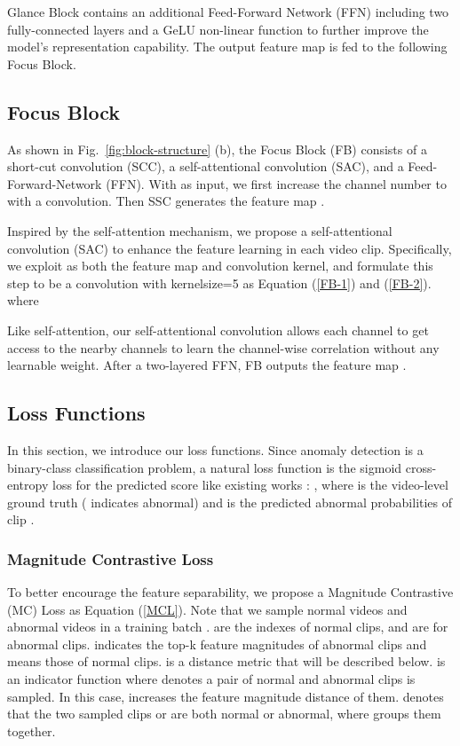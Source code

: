 \documentclass[letterpaper]{article} \usepackage{aaai23}  \usepackage{times}  \usepackage{helvet}  \usepackage{courier}  \usepackage[hyphens]{url}  \usepackage{graphicx} \urlstyle{rm} \def\UrlFont{\rm}  \usepackage{natbib}  \usepackage{caption} \frenchspacing  \setlength{\pdfpagewidth}{8.5in}  \setlength{\pdfpageheight}{11in}  \usepackage{algorithm}
\begin{document}
Glance Block contains an additional Feed-Forward Network (FFN) including two fully-connected layers and a GeLU non-linear function to further improve the model's representation capability. The output feature map {\small} is fed to the following Focus Block. 

\subsection{Focus Block}
\label{focus}
As shown in Fig.~\ref{fig:block-structure} (b), the Focus Block (FB) consists of a short-cut convolution (SCC), a self-attentional convolution (SAC), and a Feed-Forward-Network (FFN). With {\small} as input, we first increase the channel number to {\small} with a convolution. Then SSC generates the feature map {\small}. 

Inspired by the self-attention mechanism, we propose a self-attentional convolution (SAC) to enhance the feature learning in each video clip. Specifically, we exploit {\small} as both the feature map and convolution kernel, and formulate this step to be a convolution with kernelsize=5 as Equation (\ref{FB-1}) and (\ref{FB-2}). 
{\small}
where 
{\small}

Like self-attention, our self-attentional convolution allows each channel to get access to the nearby channels to learn the channel-wise correlation without any learnable weight. After a two-layered FFN, FB outputs the feature map {\small}. 



\subsection{Loss Functions}

In this section, we introduce our loss functions. Since anomaly detection is a binary-class classification problem, a natural loss function is the sigmoid cross-entropy loss for the predicted score like existing works \cite{weakly-wsvad,GCLNC,Not-only-look,RTFM}: {\small}, where  is the video-level ground truth ({\small} indicates abnormal) and {\small} is the predicted abnormal probabilities of clip {}.  

\subsubsection{Magnitude Contrastive Loss}

To better encourage the feature separability, we propose a Magnitude Contrastive (MC) Loss as Equation (\ref{MCL}). 
{\small}
Note that we sample {\small} normal videos and {\small} abnormal videos in a training batch {\small}.  are the indexes of normal clips, and  are for abnormal clips. {\small} indicates the top-k feature magnitudes of abnormal clips and {\small} means those of normal clips.  {\small} is a distance metric that will be described below. 
 is an indicator function where  denotes a pair of normal and abnormal clips  is sampled. In this case, {\small} increases the feature magnitude distance of them. {\small} denotes that the two sampled clips  or  are both normal or abnormal, where {\small} groups them together. 
\end{document}
